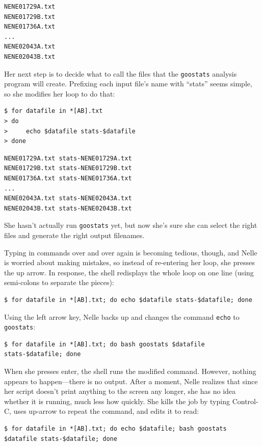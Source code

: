 \documentclass{book}
\begin{document}
\begin{verbatim}
NENE01729A.txt
NENE01729B.txt
NENE01736A.txt
...
NENE02043A.txt
NENE02043B.txt
\end{verbatim}

Her next step is to decide what to call the files that the
\texttt{goostats} analysis program will create. Prefixing each input
file's name with ``stats'' seems simple, so she modifies her loop to do
that:

\begin{verbatim}
$ for datafile in *[AB].txt
> do
>     echo $datafile stats-$datafile
> done
\end{verbatim}

\begin{verbatim}
NENE01729A.txt stats-NENE01729A.txt
NENE01729B.txt stats-NENE01729B.txt
NENE01736A.txt stats-NENE01736A.txt
...
NENE02043A.txt stats-NENE02043A.txt
NENE02043B.txt stats-NENE02043B.txt
\end{verbatim}

She hasn't actually run \texttt{goostats} yet, but now she's sure she
can select the right files and generate the right output filenames.

Typing in commands over and over again is becoming tedious, though, and
Nelle is worried about making mistakes, so instead of re-entering her
loop, she presses the up arrow. In response, the shell redisplays the
whole loop on one line (using semi-colons to separate the pieces):

\begin{verbatim}
$ for datafile in *[AB].txt; do echo $datafile stats-$datafile; done
\end{verbatim}

Using the left arrow key, Nelle backs up and changes the command
\texttt{echo} to \texttt{goostats}:

\begin{verbatim}
$ for datafile in *[AB].txt; do bash goostats $datafile stats-$datafile; done
\end{verbatim}

When she presses enter, the shell runs the modified command. However,
nothing appears to happen---there is no output. After a moment, Nelle
realizes that since her script doesn't print anything to the screen any
longer, she has no idea whether it is running, much less how quickly.
She kills the job by typing Control-C, uses up-arrow to repeat the
command, and edits it to read:

\begin{verbatim}
$ for datafile in *[AB].txt; do echo $datafile; bash goostats $datafile stats-$datafile; done
\end{verbatim}
\end{document}

